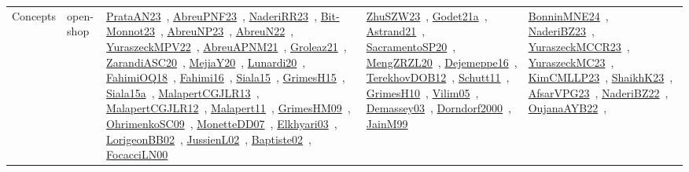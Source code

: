 {\begin{longtable}{lp{3cm}>{\raggedright\arraybackslash}p{6cm}>{\raggedright\arraybackslash}p{6cm}>{\raggedright\arraybackslash}p{8cm}}
Concepts & open-shop & \href{../works/PrataAN23.pdf}{PrataAN23}~\cite{PrataAN23}, \href{../works/AbreuPNF23.pdf}{AbreuPNF23}~\cite{AbreuPNF23}, \href{../works/NaderiRR23.pdf}{NaderiRR23}~\cite{NaderiRR23}, \href{../works/Bit-Monnot23.pdf}{Bit-Monnot23}~\cite{Bit-Monnot23}, \href{../works/AbreuNP23.pdf}{AbreuNP23}~\cite{AbreuNP23}, \href{../works/AbreuN22.pdf}{AbreuN22}~\cite{AbreuN22}, \href{../works/YuraszeckMPV22.pdf}{YuraszeckMPV22}~\cite{YuraszeckMPV22}, \href{../works/AbreuAPNM21.pdf}{AbreuAPNM21}~\cite{AbreuAPNM21}, \href{../works/Groleaz21.pdf}{Groleaz21}~\cite{Groleaz21}, \href{../works/ZarandiASC20.pdf}{ZarandiASC20}~\cite{ZarandiASC20}, \href{../works/MejiaY20.pdf}{MejiaY20}~\cite{MejiaY20}, \href{../works/Lunardi20.pdf}{Lunardi20}~\cite{Lunardi20}, \href{../works/FahimiOQ18.pdf}{FahimiOQ18}~\cite{FahimiOQ18}, \href{../works/Fahimi16.pdf}{Fahimi16}~\cite{Fahimi16}, \href{../works/Siala15.pdf}{Siala15}~\cite{Siala15}, \href{../works/GrimesH15.pdf}{GrimesH15}~\cite{GrimesH15}, \href{../works/Siala15a.pdf}{Siala15a}~\cite{Siala15a}, \href{../works/MalapertCGJLR13.pdf}{MalapertCGJLR13}~\cite{MalapertCGJLR13}, \href{../works/MalapertCGJLR12.pdf}{MalapertCGJLR12}~\cite{MalapertCGJLR12}, \href{../works/Malapert11.pdf}{Malapert11}~\cite{Malapert11}, \href{../works/GrimesHM09.pdf}{GrimesHM09}~\cite{GrimesHM09}, \href{../works/OhrimenkoSC09.pdf}{OhrimenkoSC09}~\cite{OhrimenkoSC09}, \href{../works/MonetteDD07.pdf}{MonetteDD07}~\cite{MonetteDD07}, \href{../works/Elkhyari03.pdf}{Elkhyari03}~\cite{Elkhyari03}, \href{../works/LorigeonBB02.pdf}{LorigeonBB02}~\cite{LorigeonBB02}, \href{../works/JussienL02.pdf}{JussienL02}~\cite{JussienL02}, \href{../works/Baptiste02.pdf}{Baptiste02}~\cite{Baptiste02}, \href{../works/FocacciLN00.pdf}{FocacciLN00}~\cite{FocacciLN00} & \href{../works/ZhuSZW23.pdf}{ZhuSZW23}~\cite{ZhuSZW23}, \href{../works/Godet21a.pdf}{Godet21a}~\cite{Godet21a}, \href{../works/Astrand21.pdf}{Astrand21}~\cite{Astrand21}, \href{../works/SacramentoSP20.pdf}{SacramentoSP20}~\cite{SacramentoSP20}, \href{../works/MengZRZL20.pdf}{MengZRZL20}~\cite{MengZRZL20}, \href{../works/Dejemeppe16.pdf}{Dejemeppe16}~\cite{Dejemeppe16}, \href{../works/TerekhovDOB12.pdf}{TerekhovDOB12}~\cite{TerekhovDOB12}, \href{../works/Schutt11.pdf}{Schutt11}~\cite{Schutt11}, \href{../works/GrimesH10.pdf}{GrimesH10}~\cite{GrimesH10}, \href{../works/Vilim05.pdf}{Vilim05}~\cite{Vilim05}, \href{../works/Demassey03.pdf}{Demassey03}~\cite{Demassey03}, \href{../works/Dorndorf2000.pdf}{Dorndorf2000}~\cite{Dorndorf2000}, \href{../works/JainM99.pdf}{JainM99}~\cite{JainM99} & \href{../works/BonninMNE24.pdf}{BonninMNE24}~\cite{BonninMNE24}, \href{../works/NaderiBZ23.pdf}{NaderiBZ23}~\cite{NaderiBZ23}, \href{../works/YuraszeckMCCR23.pdf}{YuraszeckMCCR23}~\cite{YuraszeckMCCR23}, \href{../works/YuraszeckMC23.pdf}{YuraszeckMC23}~\cite{YuraszeckMC23}, \href{../works/KimCMLLP23.pdf}{KimCMLLP23}~\cite{KimCMLLP23}, \href{../works/ShaikhK23.pdf}{ShaikhK23}~\cite{ShaikhK23}, \href{../works/AfsarVPG23.pdf}{AfsarVPG23}~\cite{AfsarVPG23}, \href{../works/NaderiBZ22.pdf}{NaderiBZ22}~\cite{NaderiBZ22}, \href{../works/OujanaAYB22.pdf}{OujanaAYB22}~\cite{OujanaAYB22}, 
\end{longtable}}
